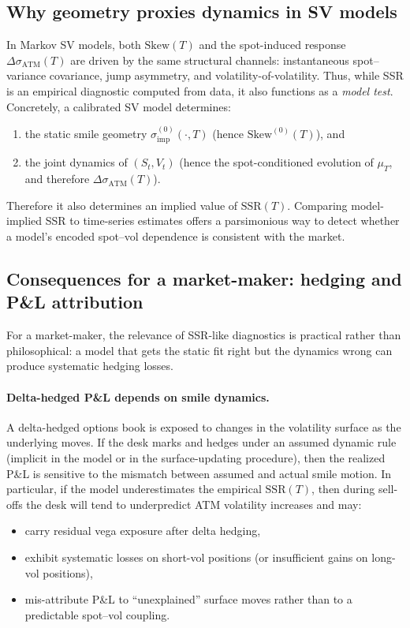\documentclass[11pt,a4paper]{report}
\begin{document}
\subsection{Why geometry proxies dynamics in SV models}
In Markov SV models, both $\mathrm{Skew}(T)$ and the spot-induced response $\Delta\sigma_{\mathrm{ATM}}(T)$ are driven by the same structural channels:
instantaneous spot--variance covariance, jump asymmetry, and volatility-of-volatility.
Thus, while SSR is an empirical diagnostic computed from data, it also functions as a \emph{model test}.
Concretely, a calibrated SV model determines:
\begin{enumerate}
\item the static smile geometry $\sigma_{\mathrm{imp}}^{(0)}(\cdot,T)$ (hence $\mathrm{Skew}^{(0)}(T)$), and
\item the joint dynamics of $(S_t,V_t)$ (hence the spot-conditioned evolution of $\mu_T$, and therefore $\Delta\sigma_{\mathrm{ATM}}(T)$).
\end{enumerate}
Therefore it also determines an implied value of $\mathrm{SSR}(T)$.
Comparing model-implied SSR to time-series estimates offers a parsimonious way to detect whether a model's encoded spot--vol dependence is consistent with the market.

\subsection{Consequences for a market-maker: hedging and P\&L attribution}
For a market-maker, the relevance of SSR-like diagnostics is practical rather than philosophical:
a model that gets the static fit right but the dynamics wrong can produce systematic hedging losses.

\paragraph{Delta-hedged P\&L depends on smile dynamics.}
A delta-hedged options book is exposed to changes in the volatility surface as the underlying moves.
If the desk marks and hedges under an assumed dynamic rule (implicit in the model or in the surface-updating procedure), then the realized P\&L is sensitive to the mismatch between assumed and actual smile motion.
In particular, if the model underestimates the empirical $\mathrm{SSR}(T)$, then during sell-offs the desk will tend to underpredict ATM volatility increases and may:
\begin{itemize}
\item carry residual vega exposure after delta hedging,
\item exhibit systematic losses on short-vol positions (or insufficient gains on long-vol positions),
\item mis-attribute P\&L to ``unexplained'' surface moves rather than to a predictable spot--vol coupling.
\end{itemize}
\end{document}
